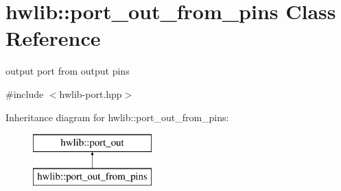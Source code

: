 \hypertarget{classhwlib_1_1port__out__from__pins}{}\section{hwlib\+:\+:port\+\_\+out\+\_\+from\+\_\+pins Class Reference}
\label{classhwlib_1_1port__out__from__pins}


output port from output pins  




{\ttfamily \#include $<$hwlib-\/port.\+hpp$>$}

Inheritance diagram for hwlib\+:\+:port\+\_\+out\+\_\+from\+\_\+pins\+:\begin{figure}[H]
\begin{center}
\leavevmode
\includegraphics[height=2.000000cm]{classhwlib_1_1port__out__from__pins}
\end{center}
\end{figure}
